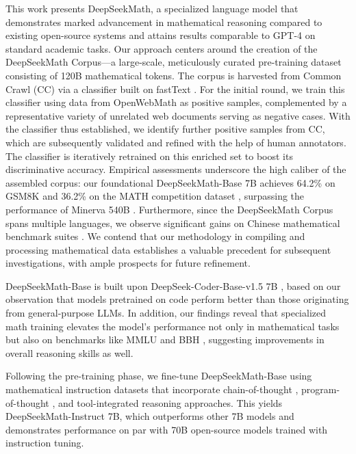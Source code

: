 This work presents DeepSeekMath, a specialized language model that demonstrates marked advancement in mathematical reasoning compared to existing open-source systems and attains results comparable to GPT-4 on standard academic tasks. Our approach centers around the creation of the DeepSeekMath Corpus—a large-scale, meticulously curated pre-training dataset consisting of 120B mathematical tokens. The corpus is harvested from Common Crawl (CC) via a classifier built on fastText \citep{joulin2016fasttext}. For the initial round, we train this classifier using data from OpenWebMath \citep{openwebmath} as positive samples, complemented by a representative variety of unrelated web documents serving as negative cases. With the classifier thus established, we identify further positive samples from CC, which are subsequently validated and refined with the help of human annotators. The classifier is iteratively retrained on this enriched set to boost its discriminative accuracy. Empirical assessments underscore the high caliber of the assembled corpus: our foundational DeepSeekMath-Base 7B achieves 64.2\% on GSM8K \citep{gsm8k} and 36.2\% on the MATH competition dataset \citep{MATH}, surpassing the performance of Minerva 540B \citep{minerva}. Furthermore, since the DeepSeekMath Corpus spans multiple languages, we observe significant gains on Chinese mathematical benchmark suites \citep{wei2023cmath,agieval}. We contend that our methodology in compiling and processing mathematical data establishes a valuable precedent for subsequent investigations, with ample prospects for future refinement.

DeepSeekMath-Base is built upon DeepSeek-Coder-Base-v1.5 7B \citep{deepseek-coder}, based on our observation that models pretrained on code perform better than those originating from general-purpose LLMs. In addition, our findings reveal that specialized math training elevates the model's performance not only in mathematical tasks but also on benchmarks like MMLU \citep{mmlu} and BBH \citep{bbh}, suggesting improvements in overall reasoning skills as well.

Following the pre-training phase, we fine-tune DeepSeekMath-Base using mathematical instruction datasets that incorporate chain-of-thought \citep{cot}, program-of-thought \citep{pot,pal}, and tool-integrated reasoning \citep{tora} approaches. This yields DeepSeekMath-Instruct 7B, which outperforms other 7B models and demonstrates performance on par with 70B open-source models trained with instruction tuning.

